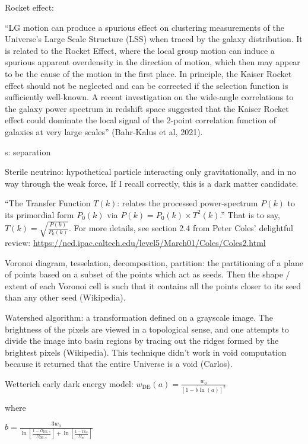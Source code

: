\documentclass[11pt]{article}
\begin{document}
Rocket effect:

``LG motion can produce a spurious effect on clustering measurements of the
Universe’s Large Scale Structure (LSS) when traced by the galaxy distribution.
It is related to the Rocket Effect, where the local group motion can induce a
spurious apparent overdensity in the direction of motion, which then may appear
to be the cause of the motion in the first place. In principle, the Kaiser
Rocket effect should not be neglected and can be corrected if the selection
function is sufficiently well-known. A recent investigation on the wide-angle
correlations to the galaxy power spectrum in redshift space suggested that the
Kaiser Rocket effect could dominate the local signal of the 2-point correlation
function of galaxies at very large scales'' (Bahr-Kalus et al, 2021).

s: separation

Sterile neutrino: hypothetical particle interacting only gravitationally, and
in no way through the weak force. If I recall correctly, this is a dark matter
candidate.

``The Transfer Function $T(k)$: relates the processed power-spectrum $P(k)$ to
its primordial form $P_0(k)$ via $P(k) = P_0(k) \times T^2(k)$.'' That is to
say, $T(k) = \sqrt{\frac{P(k)}{P_0(k)}}$. For more details, see section 2.4
from Peter Coles' delightful review:
\url{https://ned.ipac.caltech.edu/level5/March01/Coles/Coles2.html}

Voronoi diagram, tesselation, decomposition, partition: the partitioning of a
plane of points based on a subset of the points which act as seeds. Then the
shape / extent of each Voronoi cell is such that it contains all the points
closer to its seed than any other seed (Wikipedia).

Watershed algorithm: a transformation defined on a grayscale image. The
brightness of the pixels are viewed in a topological sense, and one attempts
to divide the image into basin regions by tracing out the ridges formed by
the brightest pixels (Wikipedia). This technique didn't work in void
computation because it returned that the entire Universe is a void (Carlos).

Wetterich early dark energy model:
$w_\text{DE} (a) = \frac{w_0}{[1 - b \ln(a) ]^2}$

where

$
b = \frac{3w_0}{
\ln \left[ \frac{1 - \Omega_\text{DE, e}}{\Omega_\text{DE, e}} \right]
+
\ln \left[ \frac{1 - \Omega_m}{\Omega_m} \right]}
$
\end{document}
